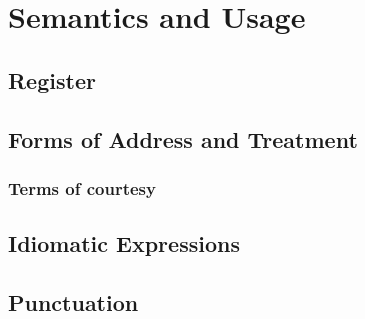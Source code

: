 \chapter{Semantics and Usage}

\section{Register}
\section{Forms of Address and Treatment}

\subsection{Terms of courtesy}

\section{Idiomatic Expressions}

\section{Punctuation}